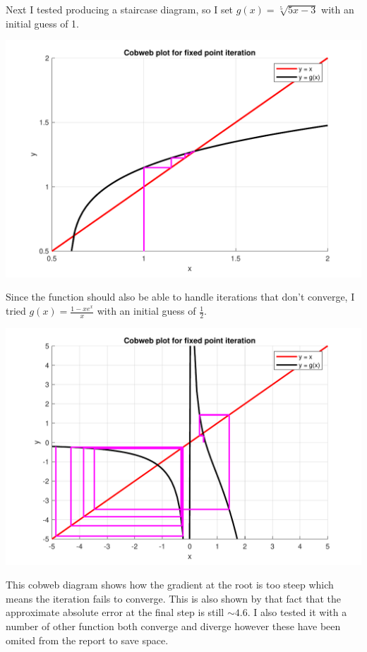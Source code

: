 \documentclass[a4paper,11pt]{article}
\begin{document}
\begin{enumerate}
	Next I tested producing a staircase diagram, so I set $g(x) = 
	\sqrt[5]{5x-3}$ with an initial guess of 1.
	
	\begin{center}
		\includegraphics[scale=0.6]{images/Q1d_staircase.pdf}
	\end{center}
	Since the function should also be able to handle iterations that don't 
	converge, I tried $g(x)=\frac{1-xe^{x}}{x}$ with an initial guess of 
	$\frac{1}{2}$.
	
	\begin{center}
		\includegraphics[scale=0.6]{images/Q1d_divergance.pdf}
	\end{center}
	This cobweb diagram shows how the gradient at the root is too steep which 
	means the iteration fails to converge. This is also shown by that fact 
	that the approximate absolute error at the final step is still $\sim4.6$. 
	I also tested it with a number of other function both converge and 
	diverge however these have been omited from the report to save space.
\end{enumerate}
\end{document}
